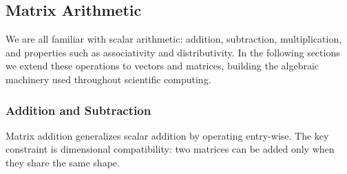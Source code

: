 \documentclass[../readings.tex]{subfiles}
\begin{document}
\subsection{Matrix Arithmetic}

We are all familiar with scalar arithmetic: addition, subtraction, multiplication, and
properties such as associativity and distributivity.  In the following sections we extend
these operations to vectors and matrices, building the algebraic machinery used throughout
scientific computing.

\subsubsection{Addition and Subtraction}

Matrix addition generalizes scalar addition by operating entry-wise.  The key constraint
is dimensional compatibility: two matrices can be added only when they share the same shape.

\label{def:matrix-sum}


\end{document}
